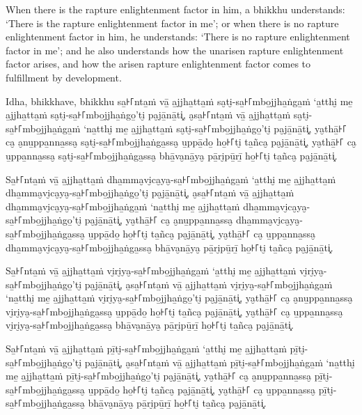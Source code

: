 When there is the rapture enlightenment factor in him, a bhikkhu understands:
`There is the rapture enlightenment factor in me'; or when there is no rapture
enlightenment factor in him, he understands: `There is no rapture enlightenment
factor in me'; and he also understands how the unarisen rapture enlightenment
factor arises, and how the arisen rapture enlightenment factor comes to
fulfillment by development.

\paliPage

Idha, bhikkhave, bhikkhu
sa̱꜔꜒nta̱ṁ vā̱ a̱jjha̱tta̱ṁ sa̮ti̮-sa̱꜔꜒mbo̱jjha̱ṅga̱ṁ ‘a̱tthi̮ me̱ a̱jjha̱tta̱ṁ sa̮ti̮-sa̱꜔꜒mbo̱jjha̱ṅgo̱’ti̮ pa̮jā̱nā̱ti͓,
a̮sa̱꜔꜒nta̱ṁ vā̱ a̱jjha̱tta̱ṁ sa̮ti̮-sa̱꜔꜒mbo̱jjha̱ṅga̱ṁ ‘na̱tthi̮ me̱ a̱jjha̱tta̱ṁ sa̮ti̮-sa̱꜔꜒mbo̱jjha̱ṅgo̱’ti̮ pa̮jā̱nā̱ti͓,
ya̮thā̱꜔꜒ ca̮ a̮nu̱ppa̱nna̱ssa̮ sa̮ti̮-sa̱꜔꜒mbo̱jjha̱ṅga̱ssa̮ u̱ppā̱do̱ ho̱꜔꜒ti̮ ta̱ñca̮ pa̮jā̱nā̱ti͓,
ya̮thā̱꜔꜒ ca̮ u̱ppa̱nna̱ssa̮ sa̮ti̮-sa̱꜔꜒mbo̱jjha̱ṅga̱ssa̮ bhā̱va̮nā̱ya̮ pā̱ri̮pū̱rī̱ ho̱꜔꜒ti̮ ta̱ñca̮ pa̮jā̱nā̱ti͓.

Sa̱꜔꜒nta̱ṁ vā̱ a̱jjha̱tta̱ṁ dha̱mma̮vi̮ca̮ya̮-sa̱꜔꜒mbo̱jjha̱ṅga̱ṁ ‘a̱tthi̮ me̱ a̱jjha̱tta̱ṁ dha̱mma̮vi̮ca̮ya̮-sa̱꜔꜒mbo̱jjha̱ṅgo̱’ti̮ pa̮jā̱nā̱ti͓,
a̮sa̱꜔꜒nta̱ṁ vā̱ a̱jjha̱tta̱ṁ dha̱mma̮vi̮ca̮ya̮-sa̱꜔꜒mbo̱jjha̱ṅga̱ṁ ‘na̱tthi̮ me̱ a̱jjha̱tta̱ṁ dha̱mma̮vi̮ca̮ya̮-sa̱꜔꜒mbo̱jjha̱ṅgo̱’ti̮ pa̮jā̱nā̱ti͓,
ya̮thā̱꜔꜒ ca̮ a̮nu̱ppa̱nna̱ssa̮ dha̱mma̮vi̮ca̮ya̮-sa̱꜔꜒mbo̱jjha̱ṅga̱ssa̮ u̱ppā̱do̱ ho̱꜔꜒ti̮ ta̱ñca̮ pa̮jā̱nā̱ti͓,
ya̮thā̱꜔꜒ ca̮ u̱ppa̱nna̱ssa̮ dha̱mma̮vi̮ca̮ya̮-sa̱꜔꜒mbo̱jjha̱ṅga̱ssa̮ bhā̱va̮nā̱ya̮ pā̱ri̮pū̱rī̱ ho̱꜔꜒ti̮ ta̱ñca̮ pa̮jā̱nā̱ti͓.

Sa̱꜔꜒nta̱ṁ vā̱ a̱jjha̱tta̱ṁ vi̮ri̮ya̮-sa̱꜔꜒mbo̱jjha̱ṅga̱ṁ ‘a̱tthi̮ me̱ a̱jjha̱tta̱ṁ vi̮ri̮ya̮-sa̱꜔꜒mbo̱jjha̱ṅgo̱’ti̮ pa̮jā̱nā̱ti͓,
a̮sa̱꜔꜒nta̱ṁ vā̱ a̱jjha̱tta̱ṁ vi̮ri̮ya̮-sa̱꜔꜒mbo̱jjha̱ṅga̱ṁ ‘na̱tthi̮ me̱ a̱jjha̱tta̱ṁ vi̮ri̮ya̮-sa̱꜔꜒mbo̱jjha̱ṅgo̱’ti̮ pa̮jā̱nā̱ti͓,
ya̮thā̱꜔꜒ ca̮ a̮nu̱ppa̱nna̱ssa̮ vi̮ri̮ya̮-sa̱꜔꜒mbo̱jjha̱ṅga̱ssa̮ u̱ppā̱do̱ ho̱꜔꜒ti̮ ta̱ñca̮ pa̮jā̱nā̱ti͓,
ya̮thā̱꜔꜒ ca̮ u̱ppa̱nna̱ssa̮ vi̮ri̮ya̮-sa̱꜔꜒mbo̱jjha̱ṅga̱ssa̮ bhā̱va̮nā̱ya̮ pā̱ri̮pū̱rī̱ ho̱꜔꜒ti̮ ta̱ñca̮ pa̮jā̱nā̱ti͓.

Sa̱꜔꜒nta̱ṁ vā̱ a̱jjha̱tta̱ṁ pī̱ti̮-sa̱꜔꜒mbo̱jjha̱ṅga̱ṁ ‘a̱tthi̮ me̱ a̱jjha̱tta̱ṁ pī̱ti̮-sa̱꜔꜒mbo̱jjha̱ṅgo̱’ti̮ pa̮jā̱nā̱ti͓,
a̮sa̱꜔꜒nta̱ṁ vā̱ a̱jjha̱tta̱ṁ pī̱ti̮-sa̱꜔꜒mbo̱jjha̱ṅga̱ṁ ‘na̱tthi̮ me̱ a̱jjha̱tta̱ṁ pī̱ti̮-sa̱꜔꜒mbo̱jjha̱ṅgo̱’ti̮ pa̮jā̱nā̱ti͓,
ya̮thā̱꜔꜒ ca̮ a̮nu̱ppa̱nna̱ssa̮ pī̱ti̮-sa̱꜔꜒mbo̱jjha̱ṅga̱ssa̮ u̱ppā̱do̱ ho̱꜔꜒ti̮ ta̱ñca̮ pa̮jā̱nā̱ti͓,
ya̮thā̱꜔꜒ ca̮ u̱ppa̱nna̱ssa̮ pī̱ti̮-sa̱꜔꜒mbo̱jjha̱ṅga̱ssa̮ bhā̱va̮nā̱ya̮ pā̱ri̮pū̱rī̱ ho̱꜔꜒ti̮ ta̱ñca̮ pa̮jā̱nā̱ti͓.

